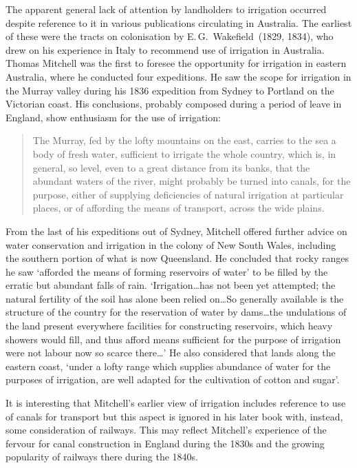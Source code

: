 The apparent general lack of attention by landholders to irrigation
occurred despite reference to it in various publications circulating
in Australia.  The earliest of these were the tracts on colonisation
by E.\,G.~Wakefield~(1829, 1834), who drew on his experience in Italy
to recommend use of irrigation in Australia.  Thomas Mitchell was the
first to foresee the opportunity for irrigation in eastern Australia,
where he conducted four expeditions.  He saw the scope for irrigation
in the Murray valley during his 1836 expedition from Sydney to
Portland on the Victorian coast.  His conclusions, probably composed during a period
of leave in England, show enthusiasm for the use of irrigation:
\begin{quote}
	The Murray, fed by the lofty mountains on the east, carries to
	the sea a body of fresh water, sufficient to irrigate the
	whole country, which is, in general, so level, even to a great
	distance from its banks, that the abundant waters of the
	river, might probably be turned into canals, for the purpose,
	either of supplying deficiencies of natural irrigation at
	particular places, or of affording the means of transport,
	across the wide plains.
\end{quote}

From the last of his expeditions out of Sydney, Mitchell offered
further advice on water conservation and irrigation in the colony of
New South Wales, including the southern portion of what is now
Queensland.  He concluded that rocky ranges he saw `afforded the means
of forming reservoirs of water' to be filled by the erratic but
abundant falls of rain.  `Irrigation\ldots has not been yet attempted;
the natural fertility of the soil has alone been relied on\ldots So
generally available is the structure of the country for the
reservation of water by dams\ldots the undulations of the land present
everywhere facilities for constructing reservoirs, which heavy showers
would fill, and thus afford means sufficient for the purpose of
irrigation were not labour now so scarce there\ldots' He also
considered that lands along the eastern coast, `under a lofty range
which supplies abundance of water for the purposes of irrigation, are
well adapted for the cultivation of cotton and
sugar'.

It is interesting that Mitchell's earlier view of irrigation includes
reference to use of canals for transport but this aspect is ignored in
his later book with, instead, some consideration of railways.  This may
reflect Mitchell's experience of the fervour for canal construction in
England during the 1830s and the growing popularity of railways there
during the 1840s.

